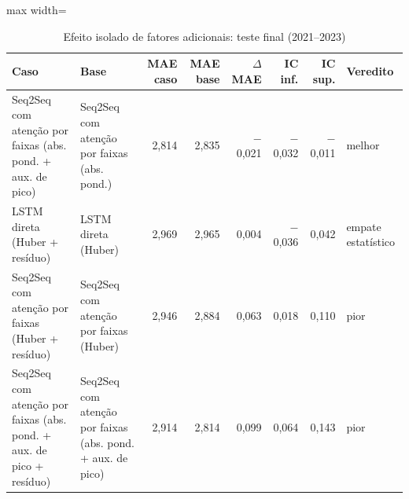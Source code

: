 \begin{table}[!htbp]
    \centering
    \caption{Efeito isolado de fatores adicionais: teste final (2021--2023)}
    \label{tab:extras_holdout}
    \small
    \begin{adjustbox}{max width=\textwidth}
    \begin{tabular}{>{\raggedright\arraybackslash}p{}>{\raggedright\arraybackslash}p{}rrrrrl}
        \toprule
        Caso & Base & MAE caso & MAE base & $\Delta$ MAE & IC inf. & IC sup. & Veredito \\
        \midrule
        Seq2Seq com atenção por faixas (abs. pond. + aux. de pico) & Seq2Seq com atenção por faixas (abs. pond.) & 2,814 & 2,835 & $-$0,021 & $-$0,032 & $-$0,011 & melhor \\
        LSTM direta (Huber + resíduo) & LSTM direta (Huber) & 2,969 & 2,965 & 0,004 & $-$0,036 & 0,042 & empate estatístico \\
        Seq2Seq com atenção por faixas (Huber + resíduo) & Seq2Seq com atenção por faixas (Huber) & 2,946 & 2,884 & 0,063 & 0,018 & 0,110 & pior \\
        Seq2Seq com atenção por faixas (abs. pond. + aux. de pico + resíduo) & Seq2Seq com atenção por faixas (abs. pond. + aux. de pico) & 2,914 & 2,814 & 0,099 & 0,064 & 0,143 & pior \\
        \bottomrule
    \end{tabular}
    \end{adjustbox}
\end{table}
